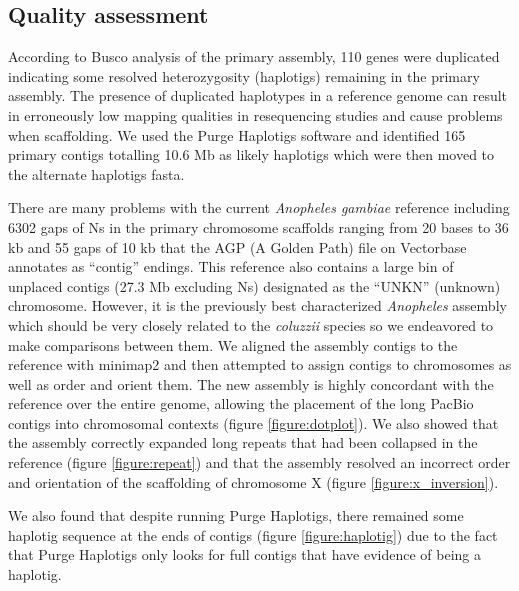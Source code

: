 \subsection{Quality assessment}

According to Busco \cite{busco} analysis of the primary assembly, 110 genes were duplicated indicating some resolved heterozygosity (haplotigs) remaining in the primary assembly. 
The presence of duplicated haplotypes in a reference genome can result in erroneously low mapping qualities in resequencing studies and cause problems when scaffolding. 
We used the Purge Haplotigs software \cite{purge} and identified 165 primary contigs totalling 10.6 Mb as likely haplotigs which were then moved to the alternate haplotigs fasta.

There are many problems with the current \textit{Anopheles gambiae} reference including 6302 gaps of Ns in the 
primary chromosome scaffolds ranging from 20 bases to 36 kb and 55 gaps of 10 kb that the AGP (A Golden Path) file on Vectorbase annotates as ``contig'' endings. 
This reference also contains a large bin of unplaced contigs (27.3 Mb excluding Ns) designated as the ``UNKN'' (unknown) chromosome. 
However, it is the previously best characterized \textit{Anopheles} assembly which should be very closely related to the \textit{coluzzii} species so 
we endeavored to make comparisons between them. We aligned the assembly contigs to the reference with minimap2 
and then attempted to assign contigs to chromosomes as well as order and orient them. The new assembly is highly concordant with the reference over the entire 
genome, allowing the placement of the long PacBio contigs into chromosomal contexts (figure \ref{figure:dotplot}). We also showed that the assembly 
correctly expanded long repeats that had been collapsed in the reference (figure \ref{figure:repeat}) and that the assembly resolved an incorrect 
order and orientation of the scaffolding of chromosome X (figure \ref{figure:x_inversion}).

We also found that despite running Purge Haplotigs, there remained some haplotig sequence at the ends of contigs (figure \ref{figure:haplotig}) due to the fact that Purge Haplotigs only 
looks for full contigs that have evidence of being a haplotig.



